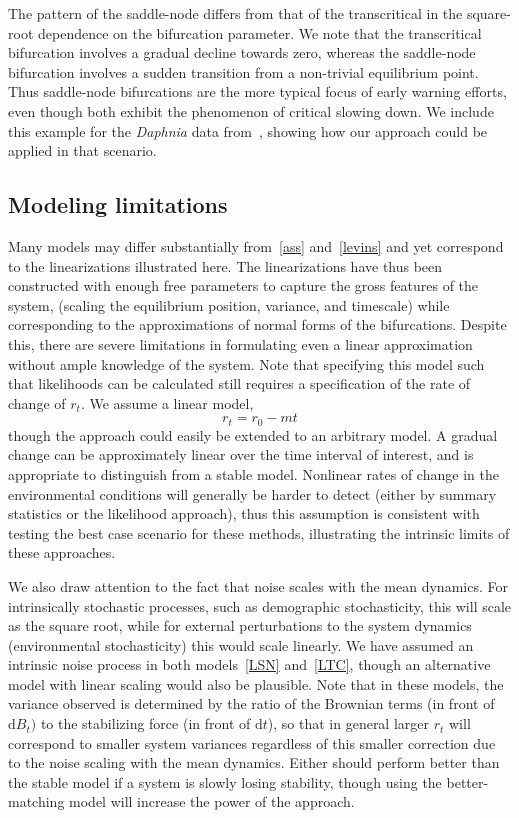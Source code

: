 \documentclass[authoryear, preprint,review,12pt]{elsarticle}
\newcommand{\ud}{\mathrm{d}}
\begin{document}
The pattern of the saddle-node differs from that of the transcritical in the square-root dependence on the bifurcation parameter.  We note that the transcritical bifurcation involves a gradual decline towards zero, whereas the saddle-node bifurcation involves a sudden transition from a non-trivial equilibrium point. Thus saddle-node bifurcations are the more typical focus of early warning efforts, even though both exhibit the phenomenon of critical slowing down.  We include this example for the \emph{Daphnia} data from~\citet{Drake2010}, showing how our approach could be applied in that scenario.  


\subsection{Modeling limitations}
Many models may differ substantially from~\eqref{ass} and~\eqref{levins} and yet correspond to the linearizations illustrated here.  
The linearizations have thus been constructed with enough free parameters to capture the gross features of the system,
(scaling the equilibrium position, variance, and timescale) while corresponding to the approximations of normal forms of the bifurcations.  
Despite this, there are severe limitations in formulating even a linear approximation without ample knowledge of the system. 
Note that specifying this model such that likelihoods can be calculated still requires a specification of the rate of change of $r_t$.
We assume a linear model,
\begin{equation}
r_t = r_0 - m t
\label{R_t}
\end{equation}
though the approach could easily be extended to an arbitrary model.
A gradual change can be approximately linear over the time interval of interest, and is appropriate to distinguish from a stable model.
Nonlinear rates of change in the environmental conditions will generally be harder to detect (either by summary statistics or the likelihood approach),
thus this assumption is consistent with testing the best case scenario for these methods, illustrating the intrinsic limits of these approaches.  

We also draw attention to the fact that noise scales with the mean dynamics.  
For intrinsically stochastic processes, such as demographic stochasticity, this will scale as the square root, 
while for external perturbations to the system dynamics (environmental stochasticity) this would scale linearly.
We have assumed an intrinsic noise process in both models~\eqref{LSN} and~\eqref{LTC}, 
though an alternative model with linear scaling would also be plausible.  
Note that in these models, the variance observed is determined by the ratio of the Brownian terms (in front of $\ud B_t)$
to the stabilizing force (in front of $\ud t$), so that in general larger $r_t$ will correspond to smaller system variances
regardless of this smaller correction due to the noise scaling with the mean dynamics.  
Either should perform better than the stable model if a system is slowly losing stability,
though using the better-matching model will increase the power of the approach.  
\end{document}
